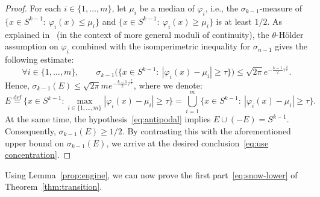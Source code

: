 \documentclass[11pt,reqno]{amsart}
\renewcommand{\le}{\leqslant}
\renewcommand{\ge}{\geqslant}
\newcommand{\eqdef}{\stackrel{\mathrm{def}}{=}}
\newcommand{\f}{\varphi}
\newcommand{\1}{\mathbf{1}}
\begin{document}
\begin{proof} For each $i\in \{1,\ldots,m\}$, let $\mu_i$ be a median of $\f_i$, i.e., the $\sigma_{k-1}$-measure of   $\{x\in S^{k-1}:\ \varphi_i(x)\le\mu_i\}$ and $\{x\in S^{k-1}:\ \varphi_i(x)\ge\mu_i\}$ is at least $1/2$. As explained in~\cite[Chapter~2]{MS86} (in the context of more general moduli of continuity),  the $\theta$-H\"older assumption on $\f_i$ combined with the isomperimetric inequality for $\sigma_{n-1}$ gives the following estimate: 
\begin{equation}\label{eq:coord-conc}
 \forall i\in \{1,\ldots,m\},\qquad    \sigma_{k-1}\Big(\big\{x\in S^{k-1}:\ |\varphi_i(x)-\mu_i|\ge \tau\big\}\Big)\le 
    \sqrt{2\pi}e^{-\frac{k-1}{2}\tau^{\frac{2}{\theta}}}.
\end{equation}
Hence, $\sigma_{k-1}(E)\le \sqrt{2\pi}m e^{-\frac{k-1}{2}\tau^{\frac{2}{\theta}}}$, where we denote:
$$
E\eqdef \Big\{x\in S^{k-1}:\max_{i\in \{1,\ldots,m\}}|\varphi_i(x)-\mu_i|\ge\tau\Big\}=\bigcup_{i=1}^m \big\{x\in S^{k-1}:\ |\varphi_i(x)-\mu_i|\ge \tau\big\}.
$$
At the same time, the hypothesis~\eqref{eq:antipodal} implies  $E\cup(-E)=S^{k-1}$. Consequently,  $\sigma_{k-1}(E)\ge1/2$. By contrasting this with the aforementioned upper bound on $\sigma_{k-1}(E)$, we arrive at the desired conclusion~\eqref{eq:use concentration}.
\end{proof}

Using Lemma~\ref{prop:engine}, we can now prove the first part~\eqref{eq:snow-lower} of Theorem~\ref{thm:transition}.
\end{document}
